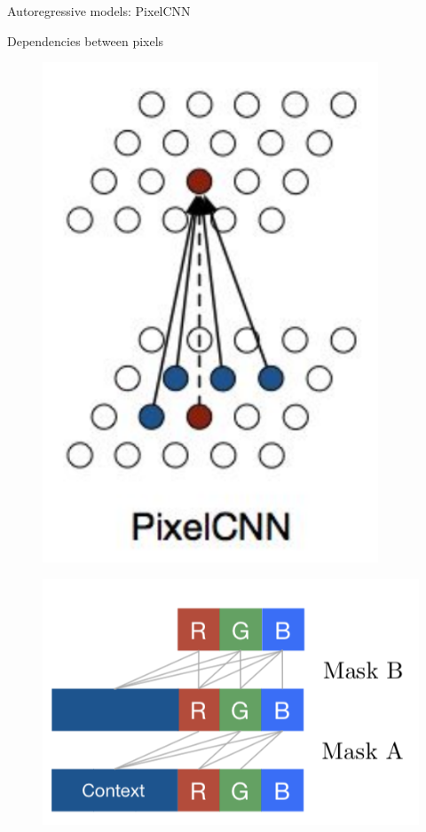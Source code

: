 \begin{frame}{Autoregressive models: PixelCNN}
\begin{minipage}[t]{0.5\columnwidth}
\begin{block}{Dependencies between pixels}
\begin{figure}
		        \includegraphics[width=0.5\linewidth]{figs/pixelcnn_0_2.png}
			\end{figure}
			\vspace{-0.3cm}
			\begin{figure}
				\centering
		        \includegraphics[width=0.65\linewidth]{figs/pixelcnn2.png}
			\end{figure}
		\end{block}
	\end{minipage}
\end{frame}
